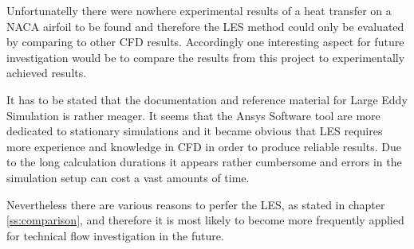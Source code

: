 Unfortunatelly there were nowhere experimental results of a heat transfer on a NACA airfoil to be found and therefore the LES method could only be evaluated by comparing to other CFD results.
Accordingly one interesting aspect for future investigation would be to compare the results from this project to experimentally achieved results.

It has to be stated that the documentation and reference material for Large Eddy Simulation is rather meager. It seems that the Ansys Software tool are more dedicated to stationary simulations and it became obvious that LES requires more experience and knowledge in CFD in order to produce reliable results. Due to the long calculation durations it appears rather cumbersome and errors in the simulation setup can cost a vast amounts of time.

Nevertheless there are various reasons to perfer the LES, as stated in chapter \ref{ss:comparison}, and therefore it is most likely to become more frequently applied for technical flow investigation in the future.

